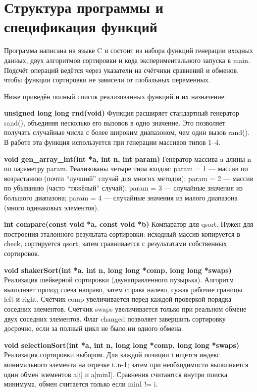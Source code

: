 \documentclass[a4paper,12pt]{article}
\newcommand{\code}[1]{{\ttfamily #1}}
\begin{document}
\section{Структура программы и спецификация функций}

Программа написана на языке C и состоит из набора функций генерации входных данных, двух алгоритмов сортировки и кода экспериментального запуска в \code{main}. Подсчёт операций ведётся через указатели на счётчики сравнений и обменов, чтобы функции сортировки не зависели от глобальных переменных.

Ниже приведён полный список реализованных функций и их назначение.

\textbf{\code{unsigned long long rnd(void)}}  
Функция расширяет стандартный генератор \code{rand()}, объединяя несколько его вызовов в одно значение. Это позволяет получать случайные числа с более широким диапазоном, чем один вызов \code{rand()}. В работе эта функция используется при генерации массивов типов 1--4.

\textbf{\code{void gen\_array\_int(int *a, int n, int param)}}  
Генератор массива \code{a} длины \code{n} по параметру \code{param}. Реализованы четыре типа входов:
\code{param = 1} --- массив по возрастанию (почти “лучший” случай для многих методов);  
\code{param = 2} --- массив по убыванию (часто “тяжёлый” случай);  
\code{param = 3} --- случайные значения из большого диапазона;  
\code{param = 4} --- случайные значения из малого диапазона (много одинаковых элементов).

\textbf{\code{int compare(const void *a, const void *b)}}  
Компаратор для \code{qsort}. Нужен для построения эталонного результата сортировки: исходный массив копируется в \code{check}, сортируется \code{qsort}, затем сравнивается с результатами собственных сортировок.

\textbf{\code{void shakerSort(int *a, int n, long long *comp, long long *swaps)}}  
Реализация шейкерной сортировки (двунаправленного пузырька). Алгоритм выполняет проход слева направо, затем справа налево, сужая рабочие границы \code{left} и \code{right}.  
Счётчик \code{*comp} увеличивается перед каждой проверкой порядка соседних элементов. Счётчик \code{*swaps} увеличивается только при реальном обмене двух соседних элементов. Флаг \code{changed} позволяет завершить сортировку досрочно, если за полный цикл не было ни одного обмена.

\textbf{\code{void selectionSort(int *a, int n, long long *comp, long long *swaps)}}  
Реализация сортировки выбором. Для каждой позиции \code{i} ищется индекс минимального элемента на отрезке \code{i..n-1}; затем при необходимости выполняется один обмен элементов \code{a[i]} и \code{a[minI]}.  
Сравнения считаются внутри поиска минимума, обмен считается только если \code{minI != i}.
\end{document}
